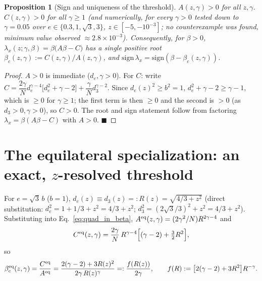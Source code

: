 \documentclass[11pt,a4paper]{article}
\theoremstyle{plain}
\newtheorem{proposition}[theorem]{Proposition}
\theoremstyle{definition}
\theoremstyle{remark}
\newcommand{\lam}{\lambda}
\newcommand{\bw}{\beta}
\newcommand{\bwc}{\beta_c}
\newcommand{\de}{d_e}
\newcommand{\dth}{d_3}
\begin{document}
\begin{proposition}[Sign and uniqueness of the threshold]
\label{prop:betac}
$A(z,\gamma)>0$ for all $z,\gamma$. $C(z,\gamma)>0$ for all $\gamma\ge1$
(and numerically, for every $\gamma>0$ tested down to $\gamma=0.05$ over
$e\in\{0.3,1,\sqrt3,3\}$, $z\in[-5,-10^{-3}]$; no counterexample was found,
minimum value observed $\approx2.8\times10^{-3}$). Consequently, for
$\bw>0$, $\lam_x(z;\gamma,\bw)=\bw\big(A\bw-C\big)$ has a single positive
root $\bwc(z,\gamma):=C(z,\gamma)/A(z,\gamma)$, and
$\mathrm{sign}\,\lam_x=\mathrm{sign}(\bw-\bwc(z,\gamma))$.
\end{proposition}
\begin{proof}
$A>0$ is immediate ($\de,\gamma>0$). For $C$: write
$C=\dfrac{2\gamma}{N}\de^{\gamma-4}\big[\de^2+\gamma-2\big]+\dfrac{\gamma}{N}\dth^{\gamma-2}$.
Since $\de(z)^2\ge b^2=1$, $\de^2+\gamma-2\ge\gamma-1$, which is $\ge0$ for
$\gamma\ge1$; the first term is then $\ge0$ and the second is $>0$
(as $\dth>0,\gamma>0$), so $C>0$. The root and sign statement follow from
factoring $\lam_x=\bw(A\bw-C)$ with $A>0$. $\blacksquare$
\end{proof}

\section{The equilateral specialization: an exact, $z$-resolved threshold}
\label{app:equilateral}

For $e=\sqrt3\,b$ ($b=1$), $\de(z)\equiv\dth(z)=:R(z)=\sqrt{4/3+z^2}$
(direct substitution: $\de^2=1+1/3+z^2=4/3+z^2$;
$\dth^2=(2\sqrt3/3)^2+z^2=4/3+z^2$). Substituting into
Eq.~\eqref{eq:quad_in_beta}, $A^{\rm eq}(z,\gamma)=(2\gamma^2/N)R^{2\gamma-4}$
and
\[
C^{\rm eq}(z,\gamma)=\frac{2\gamma}{N}\,R^{\gamma-4}\Big[(\gamma-2)+\tfrac32 R^2\Big],
\]
so
\begin{equation}
\bwc^{\rm eq}(z,\gamma)=\frac{C^{\rm eq}}{A^{\rm eq}}
=\frac{2(\gamma-2)+3R(z)^2}{2\gamma\,R(z)^\gamma}=:\frac{f(R(z))}{2\gamma},
\qquad f(R):=\big[2(\gamma-2)+3R^2\big]R^{-\gamma}.
\label{eq:betac_eq_general}
\end{equation}
\end{document}
